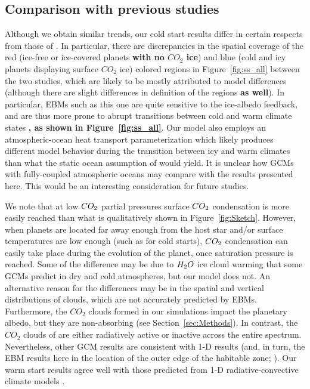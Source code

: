 \documentclass[fleqn,usenatbib]{mnras}
\providecommand{\DIFadd}[1]{{\bf #1}} %
\providecommand{\DIFdel}[1]{} %
\providecommand{\DIFaddbegin}{} %
\providecommand{\DIFaddend}{} %
\providecommand{\DIFdelbegin}{} %
\providecommand{\DIFdelend}{} %
\newcommand{\DIFscaledelfig}{0.5}
\newlength{\DIFdelgraphicswidth} %
\newlength{\DIFdelgraphicsheight} %
\newcommand{\DIFaddincludegraphics}[2][]{{\color{blue}\fbox{\DIFOincludegraphics[#1]{#2}}}} %
\newcommand{\DIFdelincludegraphics}[2][]{%
\sbox{\DIFdelgraphicsbox}{\DIFOincludegraphics[#1]{#2}}%
\settoboxwidth{\DIFdelgraphicswidth}{\DIFdelgraphicsbox} %
\settoboxtotalheight{\DIFdelgraphicsheight}{\DIFdelgraphicsbox} %
\scalebox{\DIFscaledelfig}{%
\parbox[b]{\DIFdelgraphicswidth}{\usebox{\DIFdelgraphicsbox}\\[-\baselineskip] \rule{\DIFdelgraphicswidth}{0em}}\llap{\resizebox{\DIFdelgraphicswidth}{\DIFdelgraphicsheight}{%
\setlength{\unitlength}{\DIFdelgraphicswidth}%
\begin{picture}(1,1)%
\thicklines\linethickness{2pt} %
{\color[rgb]{1,0,0}\put(0,0){\framebox(1,1){}}}%
{\color[rgb]{1,0,0}\put(0,0){\line( 1,1){1}}}%
{\color[rgb]{1,0,0}\put(0,1){\line(1,-1){1}}}%
\end{picture}%
}\hspace*{3pt}}} %
} %
\DeclareRobustCommand{\DIFaddbegin}{\DIFOaddbegin \let\includegraphics\DIFaddincludegraphics} %
\DeclareRobustCommand{\DIFaddend}{\DIFOaddend \let\includegraphics\DIFOincludegraphics} %
\DeclareRobustCommand{\DIFdelbegin}{\DIFOdelbegin \let\includegraphics\DIFdelincludegraphics} %
\DeclareRobustCommand{\DIFdelend}{\DIFOaddend \let\includegraphics\DIFOincludegraphics} %
\begin{document}
\subsection{Comparison with previous studies}

Although we obtain similar trends, our cold start results differ in certain respects from those of \citet{Turbet2017}. In particular, there are discrepancies in the spatial coverage of the red (ice-free or \DIFdelbegin \DIFdel{partially }\DIFdelend ice-covered planets \DIFaddbegin \DIFadd{with no $CO_{\mathrm{2}}$ ice}\DIFaddend ) and blue (cold and icy planets displaying surface $CO_{\mathrm{2}}$ ice) colored regions in Figure~\ref{fig:ss_all} between the two studies, which are likely to be mostly attributed to model differences (although there are slight differences in definition of the regions \DIFdelbegin \DIFdel{also}\DIFdelend \DIFaddbegin \DIFadd{as well}\DIFaddend ). In particular, EBMs such as this one are quite sensitive to the ice-albedo feedback, and are thus more prone to abrupt transitions between cold and warm climate states \citep{RamirezLevi2018}\DIFaddbegin \DIFadd{, as shown in Figure~\ref{fig:ss_all}}\DIFaddend . Our model also employs an atmospheric-ocean heat transport parameterization which likely produces different model behavior during the transition between icy and warm climates than what the static ocean assumption of \citet{Turbet2017} would yield. It is unclear how GCMs with fully-coupled atmospheric oceans may compare with the results presented here. This would be an interesting consideration for future studies. 

We note that at low $CO_{\rm 2}$ partial pressures surface $CO_{\rm 2}$ condensation is more easily reached than what is qualitatively shown in Figure~\ref{fig:Sketch}. However, when planets are located far away enough from the host star and/or surface temperatures are low enough (such as for cold starts), $CO_{\rm 2}$ condensation can easily take place during the evolution of the planet, once saturation pressure is reached. Some of the difference may be due to $H_{\rm 2}O$ ice cloud warming that some GCMs predict in dry and cold atmospheres, but our model does not. An alternative reason for the differences may be in the spatial and vertical distributions of clouds, which are not accurately predicted by EBMs. Furthermore, the $CO_{\mathrm{2}}$ clouds formed in our simulations impact the planetary albedo, but they are non-absorbing (see Section~\ref{sec:Methods}). In contrast, the $CO_{\mathrm{2}}$ clouds of \citet{Turbet2017} are either radiatively active or inactive across the entire spectrum. Nevertheless, other GCM results are consistent with 1-D results (and, in turn, the EBM results here in the location of the outer edge of the habitable zone; \citet{wolf2018erratum}). Our warm start results agree well with those predicted from 1-D radiative-convective climate models \citep{kasting1993, KumarKopparapu2013, Ramirez2018}.
\end{document}

